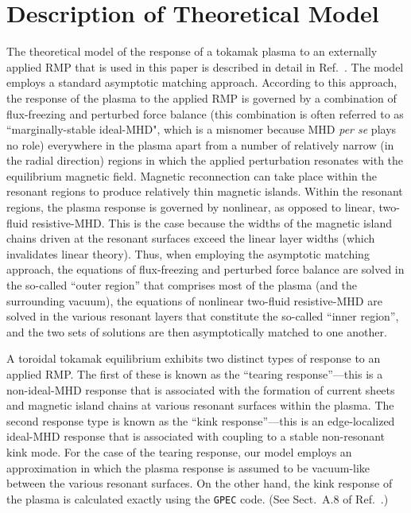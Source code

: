 \documentclass[12pt,prb,aps]{revtex4-1}
\begin{document}
\section{Description of Theoretical Model}
The theoretical model of the response of a tokamak plasma to an externally applied RMP that is used in this
paper is described in detail in Ref.~. The model employs a standard asymptotic matching approach.\cite{fkr,am1,am2,am3}
According to this approach, the response of the plasma to the applied RMP is governed by a combination of flux-freezing and
perturbed force balance (this combination is often referred to as ``marginally-stable ideal-MHD", which is a misnomer because MHD {\em per se}\/ plays no
role) everywhere in the plasma apart from a number of relatively narrow (in the radial direction) regions in which the applied
perturbation resonates with the equilibrium magnetic field. Magnetic reconnection can take place within the resonant regions to
produce relatively thin magnetic islands. Within the resonant regions, the plasma response is governed by nonlinear,
as opposed to linear, two-fluid resistive-MHD. This is the case because the widths of the magnetic island chains
driven at the resonant surfaces exceed the linear layer widths (which invalidates linear theory).\cite{rf1}
Thus, when employing the asymptotic matching approach, the equations of flux-freezing and perturbed force balance
are solved in the so-called ``outer region'' that comprises most of the plasma (and the surrounding vacuum), the equations of 
nonlinear two-fluid resistive-MHD are solved in the various resonant layers that constitute the so-called ``inner region'', and the two
sets of solutions are then asymptotically matched to one another. 

A toroidal tokamak equilibrium exhibits two distinct types of response to an applied RMP.\cite{paz1,kink0,kink1}
The first of these is known as the ``tearing response''---this is a non-ideal-MHD response that is associated with the
formation of current sheets and magnetic island chains at various resonant surfaces within the plasma. The second
response type is known as the ``kink response''---this is an edge-localized ideal-MHD response that is associated
with coupling to a stable non-resonant kink mode. For the case of the tearing response, our model employs an
approximation in which the plasma response is assumed to be vacuum-like between the various resonant surfaces. On the other hand,
the kink response of the plasma is calculated exactly using the {\tt GPEC} code.\cite{ipec,gpec} (See Sect.~A.8 of Ref.~.)
\end{document}
